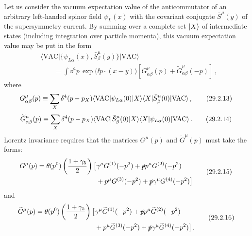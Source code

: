 Let us consider the vacuum expectation value of the anticommutator of an
arbitrary left-handed spinor field \(\psi_L(x)\) with the covariant
conjugate \(\bar S^\mu(y)\) of the supersymmetry current. By summing over
a complete set \(\ket{X}\) of intermediate states (including
integration over particle momenta), this vacuum expectation value may be
put in the form
\begin{equation}
  \begin{aligned}
  &\langle\mathrm{VAC}\lvert
    \{\psi_{L\alpha}(x),\bar S^\mu_\beta(y)\}
    \rvert\mathrm{VAC}\rangle
  \\
  &\qquad
  =\int \dd^4p\,\exp\bigl(\ii p\mathbin{\cdot}(x-y)\bigr)
    \left[G^\mu_{\alpha\beta}(p)
    +\widetilde G^\mu_{\alpha\beta}(-p)\right]\,,
  \end{aligned}
  \tag{29.2.12}\label{eq:29.2.12}
\end{equation}
where
\begin{equation}
  G^\mu_{\alpha\beta}(p)
  \equiv
  \sum_X\delta^4(p-p_X)
  \bra{\mathrm{VAC}}\psi_{L\alpha}(0)\ket{X}
  \bra{X}\bar S^\mu_\beta(0)\ket{\mathrm{VAC}}\,,
  \tag{29.2.13}\label{eq:29.2.13}
\end{equation}
\begin{equation}
  \widetilde G^\mu_{\alpha\beta}(p)
  \equiv
  \sum_X\delta^4(p-p_X)
  \bra{\mathrm{VAC}}\bar S^\mu_\beta(0)\ket{X}
  \bra{X}\psi_{L\alpha}(0)\ket{\mathrm{VAC}}\,.
  \tag{29.2.14}\label{eq:29.2.14}
\end{equation}
Lorentz invariance requires that the matrices \(G^\mu(p)\) and
\(\widetilde G^\mu(p)\) must take the forms:
\begin{equation}
  \begin{aligned}
  G^\mu(p)
  =\theta(p^0)\left(\frac{1+\gamma_5}{2}\right)
  \bigl[
    &\gamma^\mu G^{(1)}(-p^2)
    +\sl{p}p^\mu G^{(2)}(-p^2)
  \\
    &+p^\mu G^{(3)}(-p^2)
    +\sl{p}\gamma^\mu G^{(4)}(-p^2)
  \bigr]
  \end{aligned}
  \tag{29.2.15}\label{eq:29.2.15}
\end{equation}
and
\begin{equation}
  \begin{aligned}
  \widetilde G^\mu(p)
  =\theta(p^0)\left(\frac{1+\gamma_5}{2}\right)
  \bigl[
    &\gamma^\mu\widetilde G^{(1)}(-p^2)
    +\sl{p}p^\mu\widetilde G^{(2)}(-p^2)
  \\
    &+p^\mu\widetilde G^{(3)}(-p^2)
    +\sl{p}\gamma^\mu\widetilde G^{(4)}(-p^2)
  \bigr]\,.
  \end{aligned}
  \tag{29.2.16}\label{eq:29.2.16}
\end{equation}
